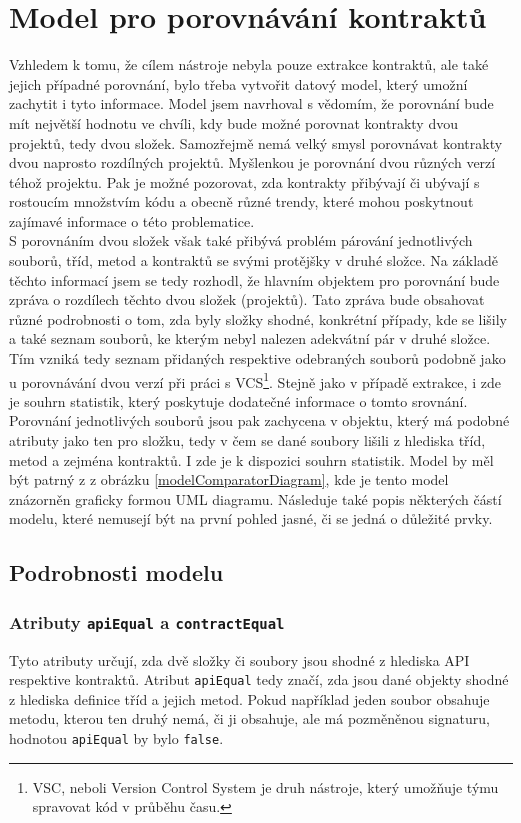 	\section{Model pro porovnávání kontraktů}
		Vzhledem k tomu, že cílem nástroje nebyla pouze extrakce kontraktů, ale také jejich případné porovnání, bylo třeba vytvořit datový model, který umožní zachytit i tyto informace. Model jsem navrhoval s vědomím, že porovnání bude mít největší hodnotu ve chvíli, kdy bude možné porovnat kontrakty dvou projektů, tedy dvou složek. Samozřejmě nemá velký smysl porovnávat kontrakty dvou naprosto rozdílných projektů. Myšlenkou je porovnání dvou různých verzí téhož projektu. Pak je možné pozorovat, zda kontrakty přibývají či ubývají s rostoucím množstvím kódu a obecně různé trendy, které mohou poskytnout zajímavé informace o této problematice.\\ 
		
		S porovnáním dvou složek však také přibývá problém párování jednotlivých souborů, tříd, metod a kontraktů se svými protějšky v druhé složce. Na základě těchto informací jsem se tedy rozhodl, že hlavním objektem pro porovnání bude zpráva o rozdílech těchto dvou složek (projektů). Tato zpráva bude obsahovat různé podrobnosti o tom, zda byly složky shodné, konkrétní případy, kde se lišily a také seznam souborů, ke kterým nebyl nalezen adekvátní pár v druhé složce. Tím vzniká tedy seznam přidaných respektive odebraných souborů podobně jako u porovnávání dvou verzí při práci s VCS\footnote{VSC, neboli Version Control System je druh nástroje, který umožňuje týmu spravovat kód v průběhu času.}. Stejně jako v případě extrakce, i zde je souhrn statistik, který poskytuje dodatečné informace o tomto srovnání.\\
				
		Porovnání jednotlivých souborů jsou pak zachycena v objektu, který má podobné atributy jako ten pro složku, tedy v čem se dané soubory lišili z hlediska tříd, metod a zejména kontraktů. I zde je k dispozici souhrn statistik. Model by měl být patrný z z obrázku \ref{modelComparatorDiagram}, kde je tento model znázorněn graficky formou UML diagramu. Následuje také popis některých částí modelu, které nemusejí být na první pohled jasné, či se jedná o důležité prvky.
		
				\subsection{Podrobnosti modelu}
				
					\subsubsection{Atributy \texttt{apiEqual} a \texttt{contractEqual}}
						Tyto atributy určují, zda dvě složky či soubory jsou shodné z hlediska API respektive kontraktů. Atribut \texttt{apiEqual} tedy značí, zda jsou dané objekty shodné z hlediska definice tříd a jejich metod. Pokud například jeden soubor obsahuje metodu, kterou ten druhý nemá, či ji obsahuje, ale má pozměněnou signaturu, hodnotou \texttt{apiEqual} by bylo \texttt{false}.\\
						
